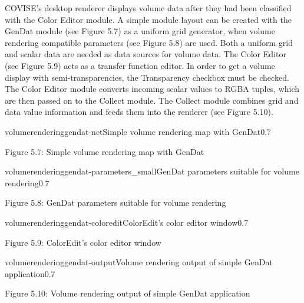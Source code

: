 COVISE's desktop renderer displays volume data after they had been classified with the Color Editor module. 
A simple module layout can be created with the GenDat module (see Figure 5.7) as a uniform grid generator, 
when volume rendering compatible parameters (see Figure 5.8) are used. 
Both a uniform grid and scalar data are needed as data sources for volume data. 
The Color Editor (see Figure 5.9) acts as a transfer function editor. 
In order to get a volume display with semi-transparencies, the Transparency checkbox must be checked. 
The Color Editor module converts incoming scalar values to RGBA tuples, which are then passed on to the Collect module. 
The Collect module combines grid and data value information and feeds them into the renderer (see Figure 5.10). 

\begin{covimg}{volumerendering}{gendat-net}{Simple volume rendering map with GenDat}{0.7}\end{covimg}
\begin{htmlonly}
Figure 5.7: Simple volume rendering map with GenDat
\vspace{0.5cm}
\end{htmlonly}

\begin{covimg}{volumerendering}{gendat-parameters_small}{GenDat parameters suitable for volume rendering}{0.7}\end{covimg}
\begin{htmlonly}
Figure 5.8: GenDat parameters suitable for volume rendering
\vspace{0.5cm}
\end{htmlonly}

\clearpage

\begin{covimg}{volumerendering}{gendat-coloredit}{ColorEdit's color editor window}{0.7}\end{covimg}
\begin{htmlonly}
Figure 5.9: ColorEdit's color editor window
\vspace{0.5cm}
\end{htmlonly}

\begin{covimg}{volumerendering}{gendat-output}{Volume rendering output of simple GenDat application}{0.7}\end{covimg}
\begin{htmlonly}
Figure 5.10: Volume rendering output of simple GenDat application 
\vspace{0.5cm}
\end{htmlonly}

